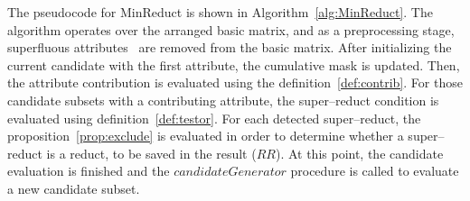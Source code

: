 \documentclass[authoryear,preprint,review,12pt]{elsarticle}
\begin{document}
	The pseudocode for MinReduct is shown in Algorithm~\ref{alg:MinReduct}. The algorithm operates over the arranged basic matrix, and as a preprocessing stage, superfluous attributes~\cite{Lazo-Cortes2013} are removed from the basic matrix. After initializing the current candidate with the first attribute, the cumulative mask is updated. Then, the attribute contribution is evaluated using the definition~\ref{def:contrib}. For those candidate subsets with a contributing attribute, the super--reduct condition is evaluated using definition~\ref{def:testor}. For each detected super--reduct, the proposition~\ref{prop:exclude} is evaluated in order to determine whether a super--reduct is a reduct, to be saved in the result ($RR$). At this point, the candidate evaluation is finished and the $candidateGenerator$ procedure is called to evaluate a new candidate subset.
	
\end{document}
